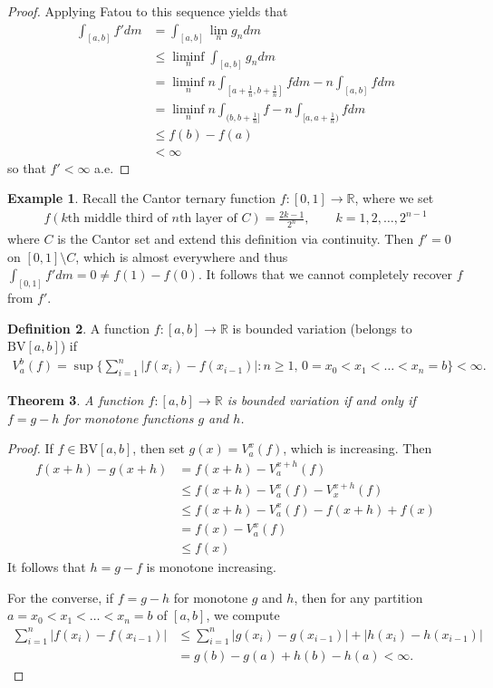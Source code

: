 \documentclass[11pt]{amsart}
\newtheorem{theorem}{Theorem}[section]
\theoremstyle{definition}
\newtheorem{definition}[theorem]{Definition}
\newtheorem{example}[theorem]{Example}
\numberwithin{equation}{section}
\begin{document}
\begin{proof}
    Applying Fatou to this sequence yields that
    \begin{align*}
        \int_{[a,b]}f'dm&=\int_{[a,b]}\lim_ng_ndm\\
        &\le\liminf_n\int_{[a,b]}g_ndm\\
        &=\liminf_nn\int_{[a+\frac{1}{n},b+\frac{1}{n}]}fdm-n\int_{[a,b]}fdm\\
        &=\liminf_nn\int_{(b,b+\frac{1}{n}]}f-n\int_{[a,a+\frac{1}{n})}fdm\\
        &\le f(b)-f(a)\\
        &<\infty
    \end{align*}
    so that $f'<\infty$ a.e.
\end{proof}
\begin{example}
    Recall the Cantor ternary function $f:[0,1]\to\mathbb R$, where we set 
    \begin{align*}
        f(k\text{th middle third of }n\text{th layer of }C)=\frac{2k-1}{2^n},\qquad k=1,2,\ldots,2^{n-1}
    \end{align*}
    where $C$ is the Cantor set and extend this definition via continuity. Then $f'=0$ on $[0,1]\setminus C$, which is almost everywhere and thus $\int_{[0,1]}f'dm=0\ne f(1)-f(0)$. It follows that we cannot completely recover $f$ from $f'$.
\end{example}
\begin{definition}
    A function $f:[a,b]\to\mathbb R$ is bounded variation (belongs to $\mathrm{BV}[a,b]$) if 
    \begin{align*}
        V_a^b(f)=\sup\{\sum_{i=1}^n|f(x_i)-f(x_{i-1})|:n\ge 1,\,0=x_0<x_1<\ldots<x_n=b\}<\infty.
    \end{align*}
\end{definition}
\begin{theorem}
    A function $f:[a,b]\to\mathbb R$ is bounded variation if and only if $f=g-h$ for monotone functions $g$ and $h$.
\end{theorem}
\begin{proof}
    If $f\in \mathrm{BV}[a,b]$, then set $g(x)=V_a^x(f)$, which is increasing. Then 
    \begin{align*}
        f(x+h)-g(x+h)&=f(x+h)-V_a^{x+h}(f)\\
        &\le f(x+h)-V_a^x(f)-V_x^{x+h}(f)\\
        &\le f(x+h)-V_a^x(f)-f(x+h)+f(x)\\
        &=f(x)-V_a^x(f)\\
        &\le f(x)
    \end{align*}
    It follows that $h=g-f$ is monotone increasing.

    For the converse, if $f=g-h$ for monotone $g$ and $h$, then for any partition $a=x_0<x_1<\ldots<x_n=b$ of $[a,b]$, we compute
    \begin{align*}
        \sum_{i=1}^n|f(x_i)-f(x_{i-1})|&\le \sum_{i=1}^n|g(x_i)-g(x_{i-1})|+|h(x_i)-h(x_{i-1})|\\
        &=g(b)-g(a)+h(b)-h(a)<\infty.
    \end{align*}
\end{proof}
\end{document}
